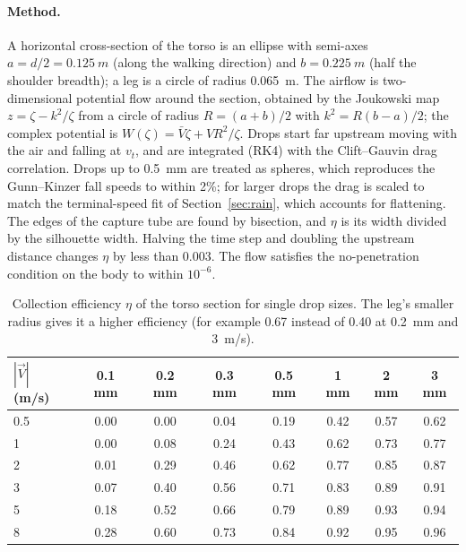 \documentclass[11pt,a4paper]{article}
\begin{document}
\paragraph{Method.} A horizontal cross-section of the torso is an ellipse with semi-axes $a=d/2=\SI{0.125}{m}$ (along the walking direction) and $b=\SI{0.225}{m}$ (half the shoulder breadth); a leg is a circle of radius \SI{0.065}{m}. The airflow is two-dimensional potential flow around the section, obtained by the Joukowski map $z=\zeta-k^2/\zeta$ from a circle of radius $R=(a+b)/2$ with $k^2=R(b-a)/2$; the complex potential is $W(\zeta)=\bar V\zeta+VR^2/\zeta$. Drops start far upstream moving with the air and falling at $v_t$, and are integrated (RK4) with the Clift--Gauvin drag correlation. Drops up to \SI{0.5}{mm} are treated as spheres, which reproduces the Gunn--Kinzer fall speeds to within 2\%; for larger drops the drag is scaled to match the terminal-speed fit of Section~\ref{sec:rain}, which accounts for flattening. The edges of the capture tube are found by bisection, and $\eta$ is its width divided by the silhouette width. Halving the time step and doubling the upstream distance changes $\eta$ by less than 0.003. The flow satisfies the no-penetration condition on the body to within $10^{-6}$.

\begin{table}[h]\centering
\caption{Collection efficiency $\eta$ of the torso section for single drop sizes. The leg's smaller radius gives it a higher efficiency (for example 0.67 instead of 0.40 at \SI{0.2}{mm} and \SI{3}{m/s}).}\label{tab:eta}
\begin{tabular}{lccccccc}\toprule
$|\vec V|$ (m/s) & 0.1 mm & 0.2 mm & 0.3 mm & 0.5 mm & 1 mm & 2 mm & 3 mm\\\midrule
0.5 & 0.00 & 0.00 & 0.04 & 0.19 & 0.42 & 0.57 & 0.62\\
1 & 0.00 & 0.08 & 0.24 & 0.43 & 0.62 & 0.73 & 0.77\\
2 & 0.01 & 0.29 & 0.46 & 0.62 & 0.77 & 0.85 & 0.87\\
3 & 0.07 & 0.40 & 0.56 & 0.71 & 0.83 & 0.89 & 0.91\\
5 & 0.18 & 0.52 & 0.66 & 0.79 & 0.89 & 0.93 & 0.94\\
8 & 0.28 & 0.60 & 0.73 & 0.84 & 0.92 & 0.95 & 0.96\\\bottomrule
\end{tabular}
\end{table}
\end{document}

